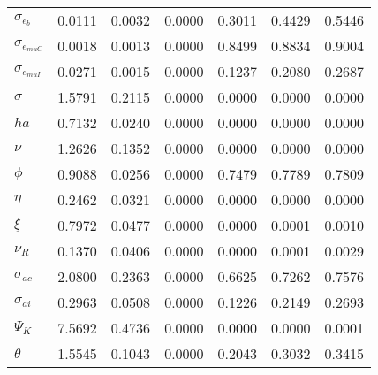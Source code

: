 \begin{center}
\begin{longtable}{lcccccc}
$ \sigma_{{e_b}}       $	 & 	          0.0111	 & 	          0.0032	 & 	          0.0000	 & 	          0.3011	 & 	          0.4429	 & 	          0.5446 \\ 
$ \sigma_{{e_{muC}}}   $	 & 	          0.0018	 & 	          0.0013	 & 	          0.0000	 & 	          0.8499	 & 	          0.8834	 & 	          0.9004 \\ 
$ \sigma_{{e_{muI}}}   $	 & 	          0.0271	 & 	          0.0015	 & 	          0.0000	 & 	          0.1237	 & 	          0.2080	 & 	          0.2687 \\ 
$ {\sigma}             $	 & 	          1.5791	 & 	          0.2115	 & 	          0.0000	 & 	          0.0000	 & 	          0.0000	 & 	          0.0000 \\ 
$ {ha}                 $	 & 	          0.7132	 & 	          0.0240	 & 	          0.0000	 & 	          0.0000	 & 	          0.0000	 & 	          0.0000 \\ 
$ \nu                  $	 & 	          1.2626	 & 	          0.1352	 & 	          0.0000	 & 	          0.0000	 & 	          0.0000	 & 	          0.0000 \\ 
$ {\phi}               $	 & 	          0.9088	 & 	          0.0256	 & 	          0.0000	 & 	          0.7479	 & 	          0.7789	 & 	          0.7809 \\ 
$ {\eta}               $	 & 	          0.2462	 & 	          0.0321	 & 	          0.0000	 & 	          0.0000	 & 	          0.0000	 & 	          0.0000 \\ 
$ \xi                  $	 & 	          0.7972	 & 	          0.0477	 & 	          0.0000	 & 	          0.0000	 & 	          0.0001	 & 	          0.0010 \\ 
$ {\nu_R}              $	 & 	          0.1370	 & 	          0.0406	 & 	          0.0000	 & 	          0.0000	 & 	          0.0001	 & 	          0.0029 \\ 
$ {\sigma_{ac}}        $	 & 	          2.0800	 & 	          0.2363	 & 	          0.0000	 & 	          0.6625	 & 	          0.7262	 & 	          0.7576 \\ 
$ {\sigma_{ai}}        $	 & 	          0.2963	 & 	          0.0508	 & 	          0.0000	 & 	          0.1226	 & 	          0.2149	 & 	          0.2693 \\ 
$ {\Psi_{K}}           $	 & 	          7.5692	 & 	          0.4736	 & 	          0.0000	 & 	          0.0000	 & 	          0.0000	 & 	          0.0001 \\ 
$ {\theta}             $	 & 	          1.5545	 & 	          0.1043	 & 	          0.0000	 & 	          0.2043	 & 	          0.3032	 & 	          0.3415 \\ 

\end{longtable}
\end{center}
